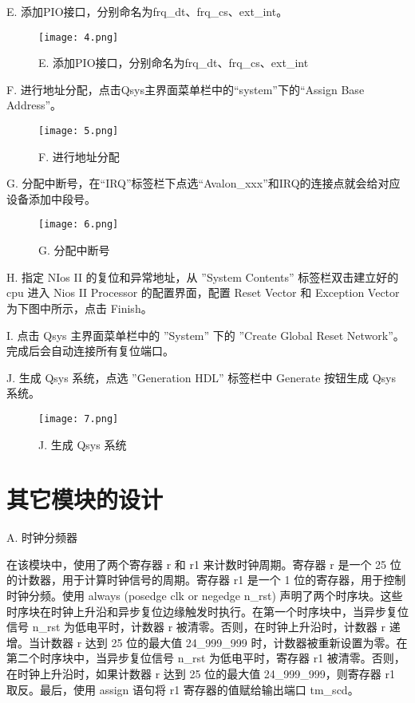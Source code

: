 \documentclass[AutoFakeBold]{LZUThesis}
\begin{document}
E. 添加PIO接口，分别命名为frq\_dt、frq\_cs、ext\_int。

\begin{figure}[htbp]
    \centering
    \texttt{[image: 4.png]}
    \caption{E. 添加PIO接口，分别命名为frq\_dt、frq\_cs、ext\_int}
\end{figure}

F. 进行地址分配，点击Qsys主界面菜单栏中的“system”下的“Assign Base Address”。

\begin{figure}[htbp]
    \centering
    \texttt{[image: 5.png]}
    \caption{F. 进行地址分配}
\end{figure}

G. 分配中断号，在“IRQ”标签栏下点选“Avalon\_xxx”和IRQ的连接点就会给对应设备添加中段号。

\begin{figure}[htbp]
    \centering
    \texttt{[image: 6.png]}
    \caption{G. 分配中断号}
\end{figure}

H. 指定 NIos II 的复位和异常地址，从 ”System Contents” 标签栏双击建立好的 cpu 进入 Nios II Processor 的配置界面，配置 Reset Vector 和 Exception Vector 为下图中所示，点击 Finish。

I. 点击 Qsys 主界面菜单栏中的 ”System” 下的 ”Create Global Reset Network”。完成后会自动连接所有复位端口。

J. 生成 Qsys 系统，点选 ”Generation HDL” 标签栏中 Generate 按钮生成 Qsys 系统。

\begin{figure}[htbp]
    \centering
    \texttt{[image: 7.png]}
    \caption{J. 生成 Qsys 系统}
\end{figure}

\section{其它模块的设计}
A. 时钟分频器

在该模块中，使用了两个寄存器 r 和 r1 来计数时钟周期。寄存器 r 是一个 25 位的计数器，用于计算时钟信号的周期。寄存器 r1 是一个 1 位的寄存器，用于控制时钟分频。使用 always \@(posedge clk or negedge n\_rst) 声明了两个时序块。这些时序块在时钟上升沿和异步复位边缘触发时执行。在第一个时序块中，当异步复位信号 n\_rst 为低电平时，计数器 r 被清零。否则，在时钟上升沿时，计数器 r 递增。当计数器 r 达到 25 位的最大值 24\_999\_999 时，计数器被重新设置为零。在第二个时序块中，当异步复位信号 n\_rst 为低电平时，寄存器 r1 被清零。否则，在时钟上升沿时，如果计数器 r 达到 25 位的最大值 24\_999\_999，则寄存器 r1 取反。最后，使用 assign 语句将 r1 寄存器的值赋给输出端口 tm\_scd。
\end{document}
